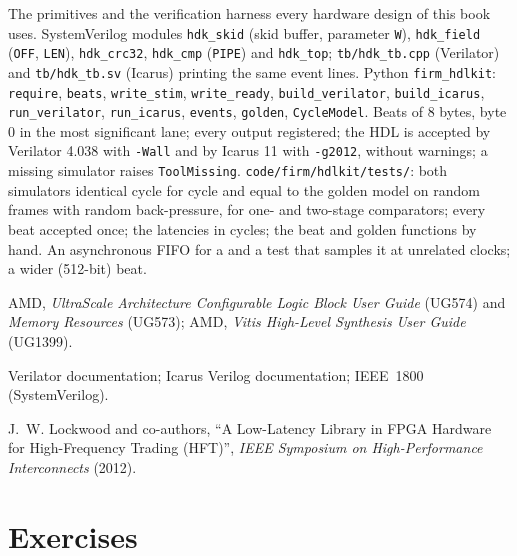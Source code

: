 \begin{build}
 The primitives and the verification harness every hardware design of this book uses.
 SystemVerilog modules \texttt{hdk\_skid} (skid buffer, parameter \texttt{W}), \texttt{hdk\_field} (\texttt{OFF},
\texttt{LEN}), \texttt{hdk\_crc32}, \texttt{hdk\_cmp} (\texttt{PIPE}) and \texttt{hdk\_top};  \texttt{tb/hdk\_tb.cpp} (Verilator)
and \texttt{tb/hdk\_tb.sv} (Icarus) printing the same event lines. Python \texttt{firm\_hdlkit}: \texttt{require}, \texttt{beats},
\texttt{write\_stim}, \texttt{write\_ready}, \texttt{build\_verilator}, \texttt{build\_icarus}, \texttt{run\_verilator},
\texttt{run\_icarus}, \texttt{events}, \texttt{golden}, \texttt{CycleModel}.
 Beats of 8 bytes, byte 0 in the most significant lane; every output registered; the HDL is accepted by Verilator 4.038 with
\texttt{-Wall} and by Icarus 11 with \texttt{-g2012}, without warnings; a missing simulator raises \texttt{ToolMissing}.
 \texttt{code/firm/hdlkit/tests/}: both simulators identical cycle for cycle and equal to the golden model on random
frames with random back-pressure, for one- and two-stage comparators; every beat accepted once; the latencies in cycles; the beat and golden
functions by hand.
 An asynchronous FIFO for a  and a test that samples it at unrelated clocks; a wider (512-bit) beat.
\end{build}

\begin{omsources}
\item AMD, \emph{UltraScale Architecture Configurable Logic Block User Guide} (UG574) and \emph{Memory Resources} (UG573); AMD, \emph{Vitis
High-Level Synthesis User Guide} (UG1399).
\item Verilator documentation; Icarus Verilog documentation; IEEE~1800 (SystemVerilog).
\item J.~W. Lockwood and co-authors, ``A Low-Latency Library in FPGA Hardware for High-Frequency Trading (HFT)'', \emph{IEEE Symposium on
High-Performance Interconnects} (2012).
\end{omsources}

\section{Exercises}

